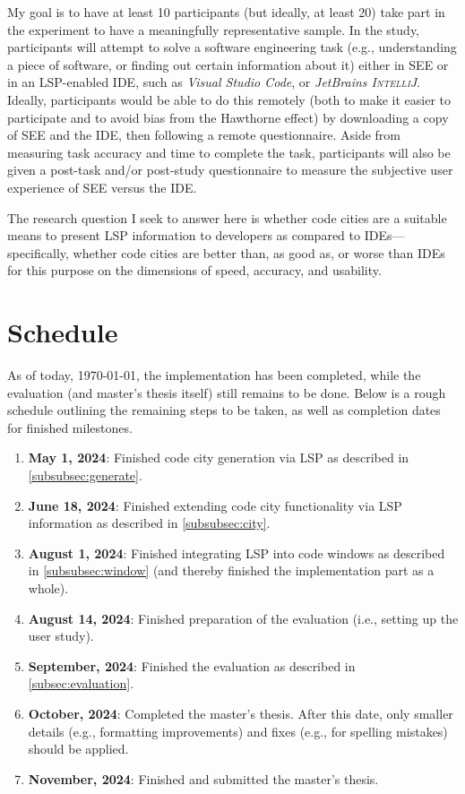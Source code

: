 \documentclass{scrartcl}
\newcommand{\SEE}{\textsc{SEE}}
\begin{document}
{My goal is to have at least 10 participants (but ideally, at least 20) take part in the experiment to have a meaningfully representative sample.
In the study, participants will attempt to solve a software engineering task (e.g., understanding a piece of software, or finding out certain information about it) either in \SEE{} or in an LSP-enabled IDE, such as \textit{Visual Studio Code}, or \textit{JetBrains \textsc{IntelliJ}}.
Ideally, participants would be able to do this remotely (both to make it easier to participate and to avoid bias from the Hawthorne effect) by downloading a copy of \SEE{} and the IDE, then following a remote questionnaire.
Aside from measuring task accuracy and time to complete the task, participants will also be given a post-task and/or post-study questionnaire to measure the subjective user experience of \SEE{} versus the IDE.

The research question I seek to answer here is whether code cities are a suitable means to present LSP information to developers as compared to IDEs---specifically, whether code cities are better than, as good as, or worse than IDEs for this purpose on the dimensions of speed, accuracy, and usability.

\section{Schedule}
As of today, \today{}, the implementation has been completed, while the evaluation (and master's thesis itself) still remains to be done.
Below is a rough schedule outlining the remaining steps to be taken, as well as completion dates for finished milestones.
\begin{enumerate}
	\item \textbf{May 1, 2024}: Finished code city generation via LSP as described in \cref{subsubsec:generate}.
	\item \textbf{June 18, 2024}: Finished extending code city functionality via LSP information as described in \cref{subsubsec:city}.
	\item \textbf{August 1, 2024}: Finished integrating LSP into code windows as described in \cref{subsubsec:window} (and thereby finished the implementation part as a whole).
	\item \textbf{August 14, 2024}: Finished preparation of the evaluation (i.e., setting up the user study).
	\item \textbf{September, 2024}: Finished the evaluation as described in \cref{subsec:evaluation}.
	\item \textbf{October, 2024}: Completed the master's thesis.
	      After this date, only smaller details (e.g., formatting improvements) and fixes (e.g., for spelling mistakes) should be applied.
	\item \textbf{November, 2024}: Finished and submitted the master's thesis.
\end{enumerate}

}
\end{document}
